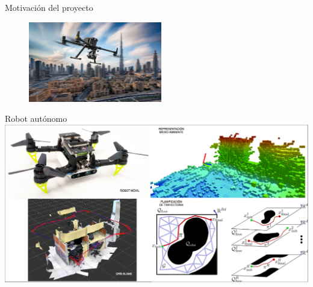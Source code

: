 \documentclass[24pt,aspectratio=169]{beamer}
\begin{document}
\begin{frame}[fragile]{Motivación del proyecto}
\begin{figure}[ht!]
\begin{minipage}{0.48\textwidth}
    \end{minipage}\hfill
    \begin{minipage}{0.48\textwidth}
      \centering
      \includegraphics[width=\linewidth,height=3.5cm]{drone_city.jpg} %
    \end{minipage}
  \end{figure}
\end{frame}


\begin{frame}{Robot autónomo}
  \centering
  \includegraphics[width=\linewidth]{ANTECEDENTES}\\
\end{frame}
\end{document}

